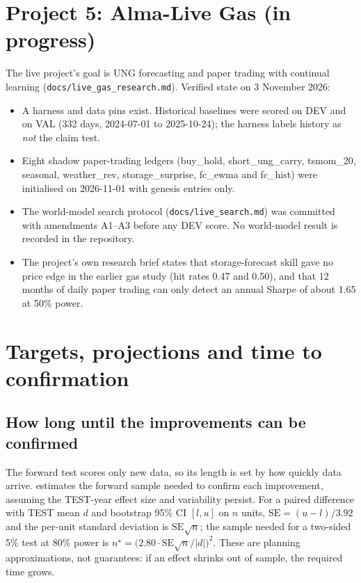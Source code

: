 \documentclass[10pt,a4paper]{article}
\newcommand{\src}[1]{{\footnotesize\texttt{#1}}}
\begin{document}
\section{Project 5: Alma-Live Gas (in progress)}
\label{sec:live}
The live project's goal is UNG forecasting and paper trading with continual learning (\src{docs/live\_gas\_research.md}). Verified state on 3 November 2026:
\begin{itemize}
\item A harness and data pins exist. Historical baselines were scored on DEV and on VAL (332 days, 2024-07-01 to 2025-10-24); the harness labels history as \emph{not} the claim test.
\item Eight shadow paper-trading ledgers (buy\_hold, short\_ung\_carry, tsmom\_20, seasonal, weather\_rev, storage\_surprise, fc\_ewma and fc\_hist) were initialised on 2026-11-01 with genesis entries only.
\item The world-model search protocol (\src{docs/live\_search.md}) was committed with amendments A1--A3 before any DEV score. No world-model result is recorded in the repository.
\item The project's own research brief states that storage-forecast skill gave no price edge in the earlier gas study (hit rates 0.47 and 0.50), and that 12 months of daily paper trading can only detect an annual Sharpe of about 1.65 at 50\% power.
\end{itemize}

\section{Targets, projections and time to confirmation}
\label{sec:projection}

\subsection{How long until the improvements can be confirmed}
The forward test scores only new data, so its length is set by how quickly data arrive.  estimates the forward sample needed to confirm each improvement, assuming the TEST-year effect size and variability persist. For a paired difference with TEST mean $d$ and bootstrap 95\% CI $[l,u]$ on $n$ units, $\mathrm{SE}=(u-l)/3.92$ and the per-unit standard deviation is $\mathrm{SE}\sqrt{n}$; the sample needed for a two-sided 5\% test at 80\% power is $n^\star=\big(2.80\cdot \mathrm{SE}\sqrt{n}/|d|\big)^2$. These are planning approximations, not guarantees: if an effect shrinks out of sample, the required time grows.
\end{document}
